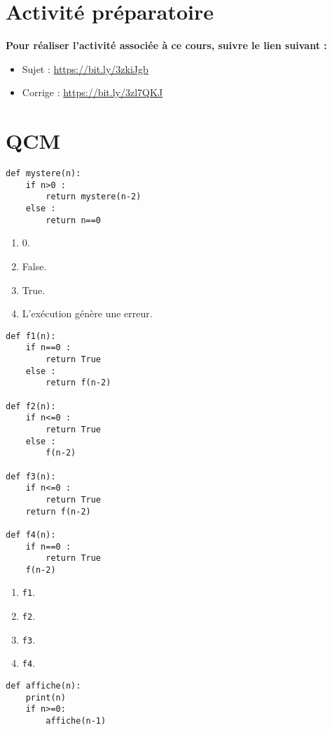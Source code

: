 \section{Activité préparatoire}
\textbf{Pour réaliser l'activité associée à ce cours, suivre le lien suivant : }
\begin{itemize} 
\item Sujet : \url{https://bit.ly/3zkiJgb}
\item Corrige : \url{https://bit.ly/3zl7QKJ}
\end{itemize}

\newpage
\section{QCM}

\begin{lstlisting}
def mystere(n):
    if n>0 :
        return mystere(n-2)
    else :
        return n==0
\end{lstlisting}

\begin{enumerate}
\item 0.
\item False.
\item True. %
\item L'exécution génère une erreur.
\end{enumerate}

\begin{lstlisting}
def f1(n):
    if n==0 :
        return True
    else :
        return f(n-2)
        
def f2(n):
    if n<=0 :
        return True
    else :
        f(n-2)
        
def f3(n):
    if n<=0 :
        return True
    return f(n-2)

def f4(n):
    if n==0 :
        return True
    f(n-2)
\end{lstlisting}


\begin{enumerate}
\item \texttt{f1}.
\item \texttt{f2}.
\item \texttt{f3}. %
\item \texttt{f4}.
\end{enumerate}

\begin{lstlisting}
def affiche(n):
    print(n)
    if n>=0:
        affiche(n-1)
\end{lstlisting}

